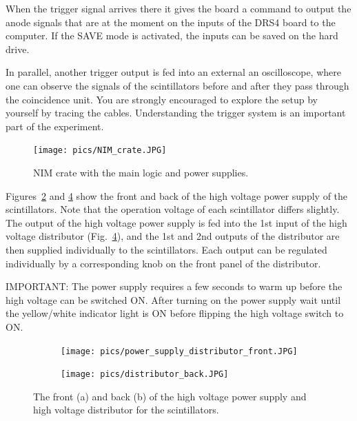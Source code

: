 \documentclass[12pt]{article}
\begin{document}
When the trigger signal arrives there it gives the board a command to output the anode signals that are at the moment on the inputs of the DRS4 board to the computer. If the SAVE mode is activated, the inputs can be saved on the hard drive.

In parallel, another trigger output is fed into an external an oscilloscope, where one can observe the signals of the scintillators before and after they pass through the coincidence unit. You are strongly encouraged to explore the setup by yourself by tracing the cables. Understanding the trigger system is an important part of the experiment. 

\begin{figure}[!h]
\texttt{[image: pics/NIM\_crate.JPG]}
\centering
\caption{NIM crate with the main logic and power supplies.}
\label{fig:NIM_crate}
\end{figure}

Figures~\ref{fig:power_supply_front} and \ref{fig:distributor} show the front and back of the high voltage power supply of the scintillators. Note that the operation voltage of each scintillator differs slightly. The output of the high voltage power supply is fed into the 1st input of the high voltage distributor (Fig.~\ref{fig:distributor}), and the 1st and 2nd outputs of the distributor are then supplied individually to the scintillators. Each output can be regulated individually by a corresponding knob on the front panel of the distributor.

IMPORTANT: The power supply requires a few seconds to warm up before the high voltage can be switched ON. After turning on the power supply wait until the yellow/white indicator light is ON before flipping the high voltage switch to ON.

\begin{figure}
	\centering
		\begin{subfigure}[b]{0.8\textwidth}
				\texttt{[image: pics/power\_supply\_distributor\_front.JPG]}
				\caption{}
				\label{fig:power_supply_front}
		\end{subfigure}
		\begin{subfigure}[b]{0.8\textwidth}
			\texttt{[image: pics/distributor\_back.JPG]}
			\caption{}
			\label{fig:distributor}
		\end{subfigure}
\caption{The front (a)  and back (b) of the high voltage power supply and high voltage distributor for the scintillators.}
\end{figure}
\end{document}
